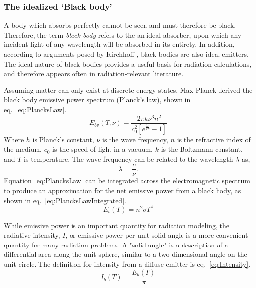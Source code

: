 \subsubsection{The idealized `Black body'}
A body which absorbs perfectly cannot be seen and must therefore be black. Therefore, the term \textit{black body} refers to the an ideal absorber, upon which any incident light of any wavelength will be absorbed in its entirety. In addition, according to arguments posed by Kirchhoff \cite{Bergman2017FundamentalsTransfer}, black-bodies are also ideal emitters.
The ideal nature of black bodies provides a useful basis for radiation calculations, and therefore appears often in radiation-relevant literature.

Assuming matter can only exist at discrete energy states, Max Planck derived the black body emissive power spectrum (Planck's law), shown in eq.~\ref{eq:PlancksLaw}.
\begin{equation}
    E_{bv}(T,\nu{}) = \frac{2\pi{}h\nu{}^3n^2}{c_0^2\left[e^\frac{h\nu{}}{kT}-1\right]}
    \label{eq:PlancksLaw}
\end{equation}
Where $h$ is Planck's constant, $\nu{}$ is the wave frequency, $n$ is the refractive index of the medium, $c_0$ is the speed of light in a vacuum, $k$ is the Boltzmann constant, and $T$ is temperature. The wave frequency can be related to the wavelength $\lambda$ as,
\begin{equation}
    \lambda{}=\frac{c}{\nu}.
    \label{eq:PlancksLaw}
\end{equation}
Equation~\ref{eq:PlancksLaw} can be integrated across the electromagnetic spectrum to produce an approximation for the net emissive power from a black body, as shown in eq.~\ref{eq:PlancksLawIntegrated}.
\begin{equation}
    E_b(T) = n^2\sigma{}T^4
    \label{eq:PlancksLawIntegrated}
\end{equation}

While emissive power is an important quantity for radiation modeling, the radiative intensity, $I$, or emissive power per unit solid angle is a more convenient quantity for many radiation problems. A "solid angle" is a description of a differential area along the unit sphere, similar to a two-dimensional angle on the unit circle. The definition for intensity from a diffuse emitter is eq.~\ref{eq:Intensity}.
\begin{equation}
    I_b(T) = \frac{E_b(T)}{\pi}
    \label{eq:Intensity}
\end{equation}


